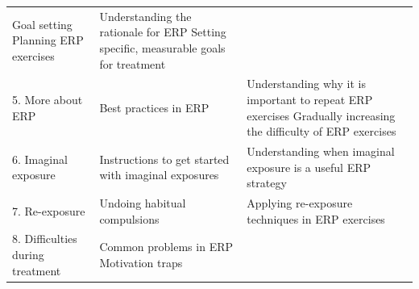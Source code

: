 \documentclass[]{book}
\theoremstyle{definition}
\theoremstyle{definition}
\theoremstyle{definition}
\theoremstyle{remark}
\begin{document}
\begin{longtable}[]{@{}lll@{}}
\begin{minipage}[t]{0.30\columnwidth}
Goal setting Planning ERP exercises\strut
\end{minipage} & \begin{minipage}[t]{0.30\columnwidth}\raggedright
Understanding the rationale for ERP Setting specific, measurable goals
for treatment\strut
\end{minipage}\tabularnewline
\begin{minipage}[t]{0.30\columnwidth}\raggedright
5. More about ERP\strut
\end{minipage} & \begin{minipage}[t]{0.30\columnwidth}\raggedright
Best practices in ERP\strut
\end{minipage} & \begin{minipage}[t]{0.30\columnwidth}\raggedright
Understanding why it is important to repeat ERP exercises Gradually
increasing the difficulty of ERP exercises\strut
\end{minipage}\tabularnewline
\begin{minipage}[t]{0.30\columnwidth}\raggedright
6. Imaginal exposure\strut
\end{minipage} & \begin{minipage}[t]{0.30\columnwidth}\raggedright
Instructions to get started with imaginal exposures\strut
\end{minipage} & \begin{minipage}[t]{0.30\columnwidth}\raggedright
Understanding when imaginal exposure is a useful ERP strategy\strut
\end{minipage}\tabularnewline
\begin{minipage}[t]{0.30\columnwidth}\raggedright
7. Re-exposure\strut
\end{minipage} & \begin{minipage}[t]{0.30\columnwidth}\raggedright
Undoing habitual compulsions\strut
\end{minipage} & \begin{minipage}[t]{0.30\columnwidth}\raggedright
Applying re-exposure techniques in ERP exercises\strut
\end{minipage}\tabularnewline
\begin{minipage}[t]{0.30\columnwidth}\raggedright
8. Difficulties during treatment\strut
\end{minipage} & \begin{minipage}[t]{0.30\columnwidth}\raggedright
Common problems in ERP Motivation traps\strut
\end{minipage} & \begin{minipage}[t]{0.30\columnwidth}\raggedright

\end{minipage}
\end{longtable}
\end{document}
